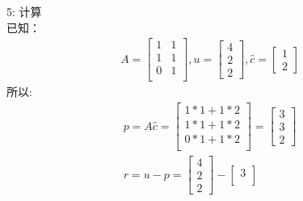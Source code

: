 \documentclass[12pt]{article}
\begin{document}
\begin{flushleft}
    5: 计算 \\
    已知： \\
    \begin{align}
        A = \begin{bmatrix}
                1 & 1 \\
                1 & 1 \\
                0 & 1 \\
            \end{bmatrix}, u = \begin{bmatrix}
                                   4 \\
                                   2 \\
                                   2
                               \end{bmatrix}, \hat{c} = \begin{bmatrix}
                                                            1 \\
                                                            2
                                                        \end{bmatrix}
    \end{align}
    所以: \\
    \begin{align}
        p = A\hat{c} = \begin{bmatrix}
                           1 * 1 + 1 * 2 \\
                           1 * 1 + 1 * 2 \\
                           0 * 1 + 1 * 2 \\
                       \end{bmatrix} = \begin{bmatrix}
                                           3 \\
                                           3 \\
                                           2
                                       \end{bmatrix}                \\
        r = u - p  =  \begin{bmatrix}
                          4 \\
                          2 \\
                          2
                      \end{bmatrix} - \begin{bmatrix}
                                          3 \\

\end{bmatrix}
\end{align}
\end{flushleft}
\end{document}
